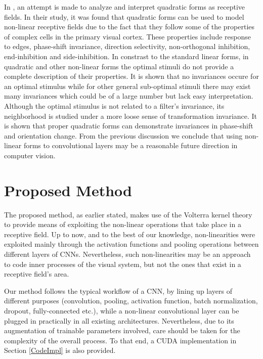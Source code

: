 \documentclass[10pt,twocolumn,letterpaper]{article}
\begin{document}
     In \cite{Analysis06}, an attempt is made to analyze and interpret quadratic forms as receptive fields. In their study, it was found that quadratic forms can be used to model non-linear receptive fields due to the fact that they follow some of the properties of complex cells in the primary visual cortex. These properties include response to edges, phase-shift invariance, direction selectivity, non-orthogonal inhibition, end-inhibition and side-inhibition. In constrast to the standard linear forms, in quadratic and other non-linear forms the optimal stimuli do not provide a complete description of their properties. It is shown that no invariances occure for an optimal stimulus while for other general sub-optimal stimuli there may exist many invariances which could be of a large number but lack easy interpretation. Although the optimal stimulus is not related to a filter's invariance, its neighborhood is studied under a more loose sense of transformation invariance. It is shown that proper quadratic forms can demonstrate invariances in phase-shift and orientation change. From the previous discussion we conclude that using non-linear forms to convolutional layers may be a reasonable future direction in computer vision.


\section{Proposed Method}
\label{PropMeth}

     The proposed method, as earlier stated, makes use of the Volterra kernel theory to provide means of exploiting the non-linear operations that take place in a receptive field. Up to now, and to the best of our knowledge, non-linearities were exploited mainly through the activation functions and pooling operations between different layers of CNNs. Nevertheless, such non-linearities may be an approach to code inner processes of the visual system, but not the ones that exist in a receptive field's area.
     
     
     Our method follows the typical workflow of a CNN, by lining up layers of different purposes (convolution, pooling, activation function, batch normalization, dropout, fully-connected etc.), while a non-linear convolutional layer can be plugged in practically in all existing architectures. Nevertheless, due to its augmentation of trainable parameters involved, care should be taken for the complexity of the overall process. To that end, a CUDA implementation in Section \ref{CodeImpl} is also provided.
\end{document}
